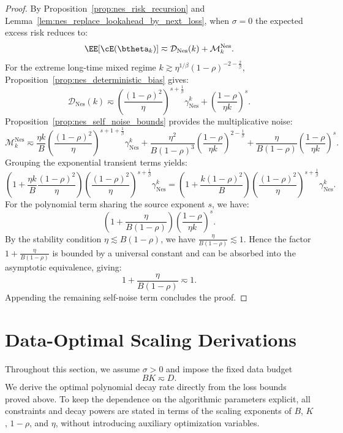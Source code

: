 \begin{proof}
By Proposition~\ref{prop:nes_risk_recursion} and Lemma~\ref{lem:nes_replace_lookahead_by_next_loss}, when \(\sigma=0\) the expected excess risk reduces to:
\[
    \EE[\cE(\btheta_k)]
    \eqsim
    \mathcal{D}_{\mathrm{Nes}}(k)
    +
    \mathcal M_k^{\mathrm{Nes}}.
\]
For the extreme long-time mixed regime \(k \gtrsim \eta^{1/\beta}(1-\rho)^{-2-\frac{2}{\beta}}\), Proposition~\ref{prop:nes_deterministic_bias} gives:
\[
    \mathcal{D}_{\mathrm{Nes}}(k)
    \eqsim
    \left(\frac{(1-\rho)^2}{\eta}\right)^{s+\frac1\beta}
    \gamma_{\mathrm{Nes}}^k
    +
    \left(\frac{1-\rho}{\eta k}\right)^s.
\]
Proposition~\ref{prop:nes_self_noise_bounds} provides the multiplicative noise:
\[
    \mathcal M_k^{\mathrm{Nes}}
    \eqsim
    \frac{\eta k}{B}
    \left(\frac{(1-\rho)^2}{\eta}\right)^{s+1+\frac1\beta}
    \gamma_{\mathrm{Nes}}^k
    +
    \frac{\eta^2}{B(1-\rho)^3}
    \left(\frac{1-\rho}{\eta k}\right)^{2-\frac1\beta}
    +
    \frac{\eta}{B(1-\rho)}
    \left(\frac{1-\rho}{\eta k}\right)^s.
\]
Grouping the exponential transient terms yields:
\[
    \left(
        1+\frac{\eta k}{B}\frac{(1-\rho)^2}{\eta}
    \right)
    \left(\frac{(1-\rho)^2}{\eta}\right)^{s+\frac1\beta}
    \gamma_{\mathrm{Nes}}^k
    =
    \left(
        1+\frac{k(1-\rho)^2}{B}
    \right)
    \left(\frac{(1-\rho)^2}{\eta}\right)^{s+\frac1\beta}
    \gamma_{\mathrm{Nes}}^k.
\]
For the polynomial term sharing the source exponent \(s\), we have:
\[
    \left(
        1+\frac{\eta}{B(1-\rho)}
    \right)
    \left(\frac{1-\rho}{\eta k}\right)^s.
\]
By the stability condition \(\eta \lesssim B(1-\rho)\), we have \(\frac{\eta}{B(1-\rho)} \lesssim 1\). Hence the factor \(1+\frac{\eta}{B(1-\rho)}\) is bounded by a universal constant and can be absorbed into the asymptotic equivalence, giving:
\[
    1+\frac{\eta}{B(1-\rho)} \eqsim 1.
\]
Appending the remaining self-noise term concludes the proof.
\end{proof}






\newpage
\section{Data-Optimal Scaling Derivations}
\label{app:data_optimal_scaling}

Throughout this section, we assume $\sigma>0$ and impose the fixed data budget
\[
    BK\eqsim D.
\]
We derive the optimal polynomial decay rate directly from the loss bounds proved above.  To keep the dependence on the algorithmic parameters explicit, all constraints and decay powers are stated in terms of the scaling exponents of $B$, $K$, $1-\rho$, and $\eta$, without introducing auxiliary optimization variables.

